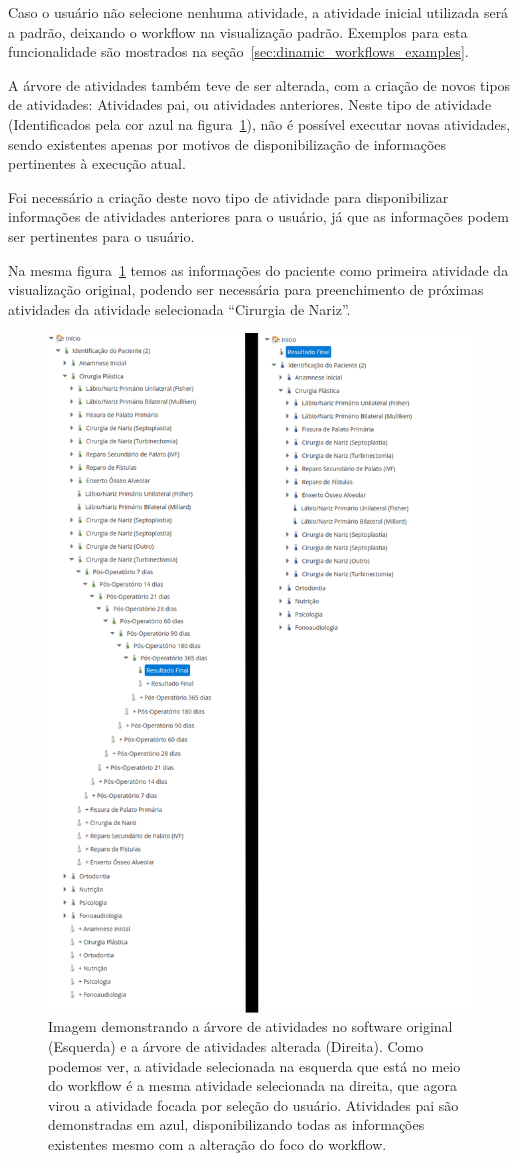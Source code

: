 Caso o usuário não selecione nenhuma atividade, a atividade inicial utilizada será a padrão, deixando o workflow na visualização padrão. Exemplos para esta funcionalidade são mostrados na seção~\ref{sec:dinamic_workflows_examples}.

A árvore de atividades também teve de ser alterada, com a criação de novos tipos de atividades: Atividades pai, ou atividades anteriores. Neste tipo de atividade (Identificados pela cor azul na figura~\ref{fig:centrare_tree_normal_altered}), não é possível executar novas atividades, sendo existentes apenas por motivos de disponibilização de informações pertinentes à execução atual.

Foi necessário a criação deste novo tipo de atividade para disponibilizar informações de atividades anteriores para o usuário, já que as informações podem ser pertinentes para o usuário.

Na mesma figura~\ref{fig:centrare_tree_normal_altered} temos as informações do paciente como primeira atividade da visualização original, podendo ser necessária para preenchimento de próximas atividades da atividade selecionada ``Cirurgia de Nariz''.

\begin{figure}
    \centering
    \includegraphics[height=1\textwidth]{imgs/CENTRARE/arvoreNormalEAlterada.png}
    \caption{Imagem demonstrando a árvore de atividades no software original (Esquerda) e a árvore de atividades alterada (Direita). Como podemos ver, a atividade selecionada na esquerda que está no meio do workflow é a mesma atividade selecionada na direita, que agora virou a atividade focada por seleção do usuário. Atividades pai são demonstradas em azul, disponibilizando todas as informações existentes mesmo com a alteração do foco do workflow.}
    \label{fig:centrare_tree_normal_altered}
\end{figure}

